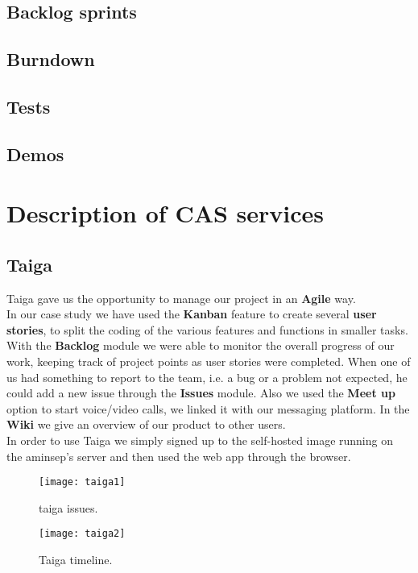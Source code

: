 \documentclass[a4paper,10pt]{report}
\begin{document}
\section{Backlog sprints}
\section{Burndown}
\section{Tests}
\section{Demos}
\chapter{Description of CAS services}
\section[Taiga]{Taiga}
Taiga gave us the opportunity to manage our project in an \textbf{Agile} way. \\
In our case study we have used the \textbf{Kanban} feature to create several \textbf{user stories}, to split the coding of the various features and functions in smaller tasks. With the \textbf{Backlog} module we were able to monitor the overall progress of our work, keeping track of project points as user stories were completed. When one of us had something to report to the team, i.e. a bug or a problem not expected, he could add a new issue through the \textbf{Issues} module.
Also we used the \textbf{Meet up} option to start voice/video calls, we linked it with our messaging platform.
In the \textbf{Wiki} we give an overview of our product to other users.\\
In order to use Taiga we simply signed up to the self-hosted image running on the aminsep's server and then used the web app through the browser.
\begin{figure}[H]
	\centering
    \texttt{[image: taiga1]}
    \caption{taiga issues.}
    \label{fig:taiga1}
\end{figure}
\begin{figure}[H]
	\centering
    \texttt{[image: taiga2]}
    \caption{Taiga timeline.}
    \label{fig:taiga2}
\end{figure}
\end{document}
